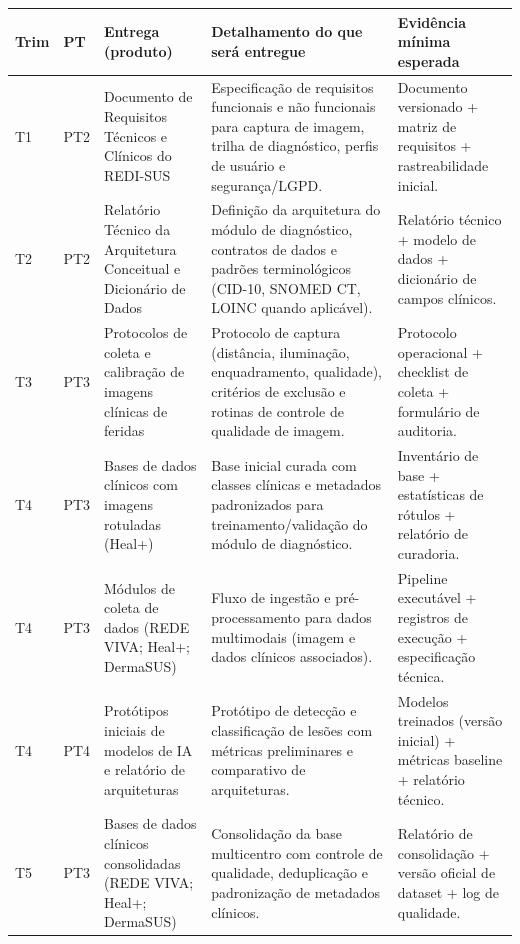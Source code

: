 \documentclass[
    12pt,
    openright,
    oneside,
    a4paper,
    chapter=TITLE,
    section=TITLE,
    brazil,
    sumario=tradicional,
    hidelinks
]{abntex2}
\begin{document}
{\footnotesize
\renewcommand{\arraystretch}{1.25}
\setlength{\tabcolsep}{3pt}
\begin{longtable}{L{0.9cm}L{1.1cm}L{3.2cm}L{4.2cm}L{3.1cm}}
\toprule
\textbf{Trim} & \textbf{PT} & \textbf{Entrega (produto)} & \textbf{Detalhamento do que será entregue} & \textbf{Evidência mínima esperada} \\
\midrule
\endhead

T1 & PT2 & Documento de Requisitos Técnicos e Clínicos do REDI-SUS & Especificação de requisitos funcionais e não funcionais para captura de imagem, trilha de diagnóstico, perfis de usuário e segurança/LGPD. & Documento versionado + matriz de requisitos + rastreabilidade inicial. \\

T2 & PT2 & Relatório Técnico da Arquitetura Conceitual e Dicionário de Dados & Definição da arquitetura do módulo de diagnóstico, contratos de dados e padrões terminológicos (CID-10, SNOMED CT, LOINC quando aplicável). & Relatório técnico + modelo de dados + dicionário de campos clínicos. \\

T3 & PT3 & Protocolos de coleta e calibração de imagens clínicas de feridas & Protocolo de captura (distância, iluminação, enquadramento, qualidade), critérios de exclusão e rotinas de controle de qualidade de imagem. & Protocolo operacional + checklist de coleta + formulário de auditoria. \\

T4 & PT3 & Bases de dados clínicos com imagens rotuladas (Heal+) & Base inicial curada com classes clínicas e metadados padronizados para treinamento/validação do módulo de diagnóstico. & Inventário de base + estatísticas de rótulos + relatório de curadoria. \\

T4 & PT3 & Módulos de coleta de dados (REDE VIVA; Heal+; DermaSUS) & Fluxo de ingestão e pré-processamento para dados multimodais (imagem e dados clínicos associados). & Pipeline executável + registros de execução + especificação técnica. \\

T4 & PT4 & Protótipos iniciais de modelos de IA e relatório de arquiteturas & Protótipo de detecção e classificação de lesões com métricas preliminares e comparativo de arquiteturas. & Modelos treinados (versão inicial) + métricas baseline + relatório técnico. \\

T5 & PT3 & Bases de dados clínicos consolidadas (REDE VIVA; Heal+; DermaSUS) & Consolidação da base multicentro com controle de qualidade, deduplicação e padronização de metadados clínicos. & Relatório de consolidação + versão oficial de dataset + log de qualidade. \\


\end{longtable}}
\end{document}

